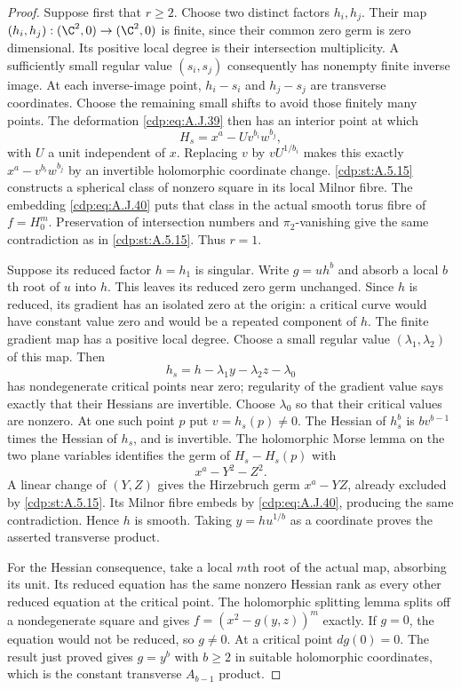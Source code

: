 \begin{proof}
Suppose first that $r\ge2$. Choose two distinct
factors $h_i,h_j$. Their map
$(h_i,h_j):(\C^2,0)\to(\C^2,0)$ is finite,
since their common zero germ is zero dimensional.
Its positive local degree is their intersection
multiplicity. A sufficiently small regular value
$(s_i,s_j)$ consequently has nonempty finite
inverse image. At each inverse-image point,
$h_i-s_i$ and $h_j-s_j$ are transverse coordinates.
Choose the remaining small shifts to avoid those
finitely many points. The deformation \eqref{cdp:eq:A.J.39}
then has an interior point at which
\[
            H_s=x^a-U v^{b_i}w^{b_j},
\]
with $U$ a unit independent of $x$. Replacing
$v$ by $vU^{1/b_i}$ makes this exactly
$x^a-v^{b_i}w^{b_j}$ by an invertible holomorphic
coordinate change. \ref{cdp:st:A.5.15} constructs a spherical
class of nonzero square in its local Milnor fibre.
The embedding \eqref{cdp:eq:A.J.40} puts that class in the
actual smooth torus fibre of $f=H_0^m$.
Preservation of intersection
numbers and $\pi_2$-vanishing give the same
contradiction as in \ref{cdp:st:A.5.15}. Thus $r=1$.

Suppose its reduced factor $h=h_1$ is singular.
Write $g=u h^b$ and absorb a local $b$th root of
$u$ into $h$. This leaves its reduced zero germ
unchanged. Since $h$ is reduced, its gradient
has an isolated zero at the origin: a critical
curve would have constant value zero and would
be a repeated component of $h$. The finite
gradient map has a positive local degree.
Choose a small regular value
$(\lambda_1,\lambda_2)$ of this map. Then
\[
        h_s=h-\lambda_1y-\lambda_2z-\lambda_0
\]
has nondegenerate critical points near zero;
regularity of the gradient value says exactly
that their Hessians are invertible. Choose
$\lambda_0$ so that their critical values are
nonzero. At one such point $p$ put
$v=h_s(p)\ne0$. The Hessian of $h_s^b$ is
$b v^{b-1}$ times the Hessian of $h_s$, and
is invertible. The holomorphic Morse lemma on
the two plane variables identifies the germ of
$H_s-H_s(p)$ with
\[
                         x^a-Y^2-Z^2.
\]
A linear change of $(Y,Z)$ gives the Hirzebruch
germ $x^a-YZ$, already excluded by \ref{cdp:st:A.5.15}.
Its Milnor fibre embeds by \eqref{cdp:eq:A.J.40}, producing
the same contradiction. Hence $h$ is smooth.
Taking $y=h u^{1/b}$ as a coordinate proves the
asserted transverse product.

For the Hessian consequence, take a local $m$th
root of the actual map, absorbing its unit.
Its reduced equation has the same nonzero
Hessian rank as every other reduced equation
at the critical point. The holomorphic splitting
lemma splits off a nondegenerate square and
gives $f=(x^2-g(y,z))^m$ exactly. If $g=0$,
the equation would not be reduced, so $g\ne0$.
At a critical point $dg(0)=0$. The result just
proved gives $g=y^b$ with $b\ge2$ in suitable
holomorphic coordinates, which is the constant
transverse $A_{b-1}$ product.
\end{proof}


